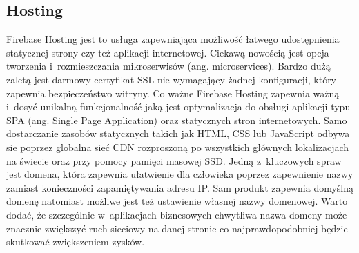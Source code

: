 \documentclass[../Kamil_Kowalewski_Main.tex]{subfiles}
\begin{document}
{{        \subsection{Hosting}
        \label{chapter3:technologie:firebase:hosting} {
            Firebase Hosting jest to usługa zapewniająca możliwość łatwego udostępnienia
            statycznej strony czy też aplikacji internetowej. Ciekawą nowością jest
            opcja tworzenia i~rozmieszczania mikroserwisów (ang. microservices). Bardzo
            dużą zaletą jest darmowy certyfikat SSL\cite{website:ssl} nie wymagający żadnej
            konfiguracji, który zapewnia bezpieczeństwo witryny. Co ważne Firebase
            Hosting zapewnia ważną i~dosyć unikalną funkcjonalność jaką jest
            optymalizacja do obsługi aplikacji typu SPA (ang. Single Page Application)
            oraz statycznych stron internetowych. Samo dostarczanie zasobów statycznych
            takich jak HTML, CSS lub JavaScript odbywa sie poprzez globalna sieć CDN
            rozproszoną po wszystkich głównych lokalizacjach na świecie oraz przy
            pomocy pamięci masowej SSD. Jedną z~kluczowych spraw jest domena, która
            zapewnia ułatwienie dla człowieka poprzez zapewnienie nazwy zamiast
            konieczności zapamiętywania adresu IP. Sam produkt zapewnia domyślną domenę
            natomiast możliwe jest też ustawienie własnej nazwy domenowej. Warto dodać,
            że szczególnie w~aplikacjach biznesowych chwytliwa nazwa domeny może
            znacznie zwiększyć ruch sieciowy na danej stronie co najprawdopodobniej
            będzie skutkować zwiększeniem zysków.
        }

}}
\end{document}
